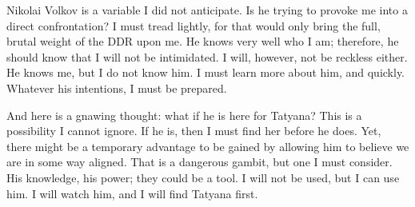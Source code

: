 Nikolai Volkov is a variable I did not anticipate.
Is he trying to provoke me into a direct confrontation? I must tread lightly, for that would only bring the full, brutal weight of the DDR upon me.
He knows very well who I am; therefore, he should know that I will not be intimidated.
I will, however, not be reckless either.
He knows me, but I do not know him.
I must learn more about him, and quickly.
Whatever his intentions, I must be prepared.

And here is a gnawing thought: what if he is here for Tatyana? This is a possibility I cannot ignore.
If he is, then I must find her before he does.
Yet, there might be a temporary advantage to be gained by allowing him to believe we are in some way aligned.
That is a dangerous gambit, but one I must consider.
His knowledge, his power; they could be a tool.
I will not be used, but I can use him.
I will watch him, and I will find Tatyana first.

\vfill\newpage

